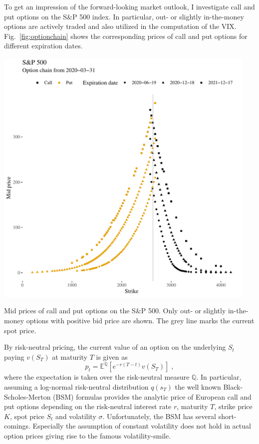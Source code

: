 \documentclass[a4paper]{tufte-handout}
\newcommand{\E}{\mathbb{E}}
\newcommand{\Q}{\mathbb{Q}}
\newcommand{\fig}[1]{Fig.~\ref{fig:#1}}
\begin{document}
To get an impression of the forward-looking market outlook, I
investigate call and put options on the S\&P 500 index. In particular,
out- or slightly in-the-money options are actively traded and also
utilized in the computation of the VIX. \fig{optionchain} shows the
corresponding prices of call and put options for different expiration
dates.
\begin{marginfigure}
  \begin{center}
    \includegraphics[width=0.95\textwidth]{../figs/option_chain.pdf}
  \end{center}
  \caption{\label{fig:optionchain} Mid prices of call and put options
    on the S\&P 500. Only out- or slightly in-the-money options with
    positive bid price are shown. The grey line marks the current spot
    price.}
\end{marginfigure}

By risk-neutral pricing, the current value of an option on the
underlying $S_t$ paying $v(S_T)$ at maturity $T$ is given as
\[ p_t = \E^{\Q}[e^{- r (T - t)} v(S_T)] \; , \]
where the expectation is taken over the risk-neutral measure $\Q$. In
particular, assuming a log-normal risk-neutral distribution $q(s_T)$
the well known Black-Scholes-Merton (BSM) formulas provides the
analytic price of European call and put options depending on the
risk-neutral interest rate $r$, maturity $T$, strike price $K$, spot
price $S_t$ and volatility $\sigma$. Unfortunately, the BSM has
several short-comings. Especially the assumption of constant
volatility does not hold in actual option prices giving rise to the
famous volatility-smile.
\end{document}
